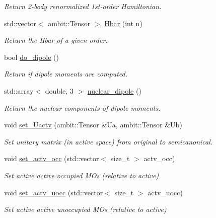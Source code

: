 \begin{DoxyCompactItemize}
\begin{DoxyCompactList}\small\item\em Return 2-\/body renormalized 1st-\/order Hamiltonian. \end{DoxyCompactList}\item 
std\+::vector$<$ ambit\+::\+Tensor $>$ \mbox{\hyperlink{classforte_1_1_m_a_s_t_e_r___d_s_r_g_a55af5152fa737f06288f75ecf6d7769e}{Hbar}} (int n)
\begin{DoxyCompactList}\small\item\em Return the Hbar of a given order. \end{DoxyCompactList}\item 
bool \mbox{\hyperlink{classforte_1_1_m_a_s_t_e_r___d_s_r_g_adc353fcdaf3ee4d57e45ba6cb3cd6112}{do\+\_\+dipole}} ()
\begin{DoxyCompactList}\small\item\em Return if dipole moments are computed. \end{DoxyCompactList}\item 
std\+::array$<$ double, 3 $>$ \mbox{\hyperlink{classforte_1_1_m_a_s_t_e_r___d_s_r_g_a65e730b294734010628e9e560fb15f76}{nuclear\+\_\+dipole}} ()
\begin{DoxyCompactList}\small\item\em Return the nuclear components of dipole moments. \end{DoxyCompactList}\item 
void \mbox{\hyperlink{classforte_1_1_m_a_s_t_e_r___d_s_r_g_a43f6bc4463fde67f20945268d867b75b}{set\+\_\+\+Uactv}} (ambit\+::\+Tensor \&Ua, ambit\+::\+Tensor \&Ub)
\begin{DoxyCompactList}\small\item\em Set unitary matrix (in active space) from original to semicanonical. \end{DoxyCompactList}\item 
void \mbox{\hyperlink{classforte_1_1_m_a_s_t_e_r___d_s_r_g_a5302d7a5a6c0a909ab75705405ae2961}{set\+\_\+actv\+\_\+occ}} (std\+::vector$<$ size\+\_\+t $>$ actv\+\_\+occ)
\begin{DoxyCompactList}\small\item\em Set active active occupied M\+Os (relative to active) \end{DoxyCompactList}\item 
void \mbox{\hyperlink{classforte_1_1_m_a_s_t_e_r___d_s_r_g_abbac08c5beb5a618497206c02f4eb45f}{set\+\_\+actv\+\_\+uocc}} (std\+::vector$<$ size\+\_\+t $>$ actv\+\_\+uocc)
\begin{DoxyCompactList}\small\item\em Set active active unoccupied M\+Os (relative to active) \end{DoxyCompactList}\end{DoxyCompactItemize}

